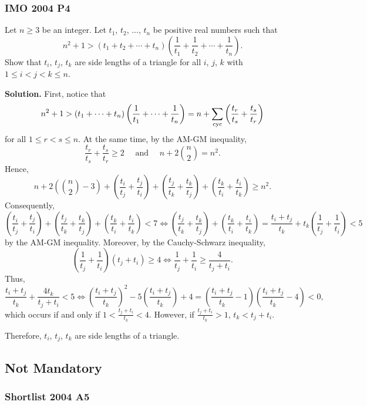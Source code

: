 \documentclass[12pt]{article}
\begin{document}
\clearpage

\subsubsection{IMO 2004 P4}

\begin{problem}
Let $n \geq 3$ be an integer. Let $t_1$, $t_2$, ..., $t_n$ be positive real numbers such that\[n^2 + 1 > \left( t_1 + t_2 + \cdots + t_n \right) \left( \frac{1}{t_1} + \frac{1}{t_2} + \cdots + \frac{1}{t_n} \right).\]Show that $t_i$, $t_j$, $t_k$ are side lengths of a triangle for all $i$, $j$, $k$ with $1 \leq i < j < k \leq n$.
\end{problem}
\textbf{\textcolor{color1}{Solution.}} \quad First, notice that
\[
	n^2+1>(t_1+\dots+t_n)\left(\frac{1}{t_1}+\dots+\frac{1}{t_n}\right) = n+ \sum_{\text{cyc}} \left(\frac{t_r}{t_s}+\frac{t_s}{t_r}\right)
\]
for all $1\le r < s \le n$. At the same time, by the AM-GM inequality,
\[
	\frac{t_r}{t_s}+\frac{t_s}{t_r}\ge2 \quad \text{ and } \quad n+2\binom{n}{2}=n^2.
\]
Hence,
\[
	n+ 2\left(\binom{n}{2}-3\right) + \left(\frac{t_i}{t_j}+\frac{t_j}{t_i}\right) + \left(\frac{t_j}{t_k}+\frac{t_k}{t_j}\right) + \left(\frac{t_k}{t_i}+\frac{t_i}{t_k}\right) \ge n^2.
\]
Consequently,
\[
	\left(\frac{t_i}{t_j}+\frac{t_j}{t_i}\right) + \left(\frac{t_j}{t_k}+\frac{t_k}{t_j}\right) + \left(\frac{t_k}{t_i}+\frac{t_i}{t_k}\right)
	< 7 \iff \left(\frac{t_j}{t_k}+\frac{t_k}{t_j}\right) + \left(\frac{t_k}{t_i}+\frac{t_i}{t_k}\right) = \frac{t_i+t_j}{t_k}+t_k\left(\frac{1}{t_j}+\frac{1}{t_i}\right) < 5
\]
by the AM-GM inequality. Moreover, by the Cauchy-Schwarz inequality,
\[
	\left(\frac{1}{t_j}+\frac{1}{t_i}\right)\left(t_j+t_i\right) \ge 4 \iff \frac{1}{t_j}+\frac{1}{t_i} \ge \frac{4}{t_j+t_i}.
\]
Thus,
\[
	\frac{t_i+t_j}{t_k}+\frac{4t_k}{t_j+t_i} < 5 \iff \left(\frac{t_i+t_j}{t_k}\right)^2-5\left(\frac{t_i+t_j}{t_k}\right)+4 = \left(\frac{t_i+t_j}{t_k}-1\right)\left(\frac{t_i+t_j}{t_k}-4\right) < 0,
\]
which occurs if and only if $1<\frac{t_j+t_i}{t_k}<4$. However, if $\frac{t_j+t_i}{t_k}>1$, $t_k<t_j+t_i$.

Therefore, $t_i$, $t_j$, $t_k$ are side lengths of a triangle.

\clearpage

\subsection{Not Mandatory}

\subsubsection{Shortlist 2004 A5}
\end{document}
